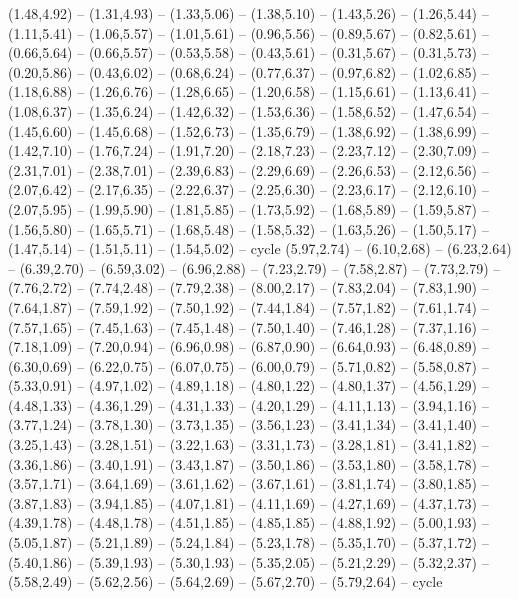 \expandafter\def\csname geo:gebiet:1945-Netherlands\endcsname{
  (1.48,4.92) -- (1.31,4.93) -- (1.33,5.06) -- (1.38,5.10) -- (1.43,5.26) -- (1.26,5.44) -- (1.11,5.41) -- (1.06,5.57) -- (1.01,5.61) -- (0.96,5.56) -- (0.89,5.67) -- (0.82,5.61) -- (0.66,5.64) -- (0.66,5.57) -- (0.53,5.58) -- (0.43,5.61) -- (0.31,5.67) -- (0.31,5.73) -- (0.20,5.86) -- (0.43,6.02) -- (0.68,6.24) -- (0.77,6.37) -- (0.97,6.82) -- (1.02,6.85) -- (1.18,6.88) -- (1.26,6.76) -- (1.28,6.65) -- (1.20,6.58) -- (1.15,6.61) -- (1.13,6.41) -- (1.08,6.37) -- (1.35,6.24) -- (1.42,6.32) -- (1.53,6.36) -- (1.58,6.52) -- (1.47,6.54) -- (1.45,6.60) -- (1.45,6.68) -- (1.52,6.73) -- (1.35,6.79) -- (1.38,6.92) -- (1.38,6.99) -- (1.42,7.10) -- (1.76,7.24) -- (1.91,7.20) -- (2.18,7.23) -- (2.23,7.12) -- (2.30,7.09) -- (2.31,7.01) -- (2.38,7.01) -- (2.39,6.83) -- (2.29,6.69) -- (2.26,6.53) -- (2.12,6.56) -- (2.07,6.42) -- (2.17,6.35) -- (2.22,6.37) -- (2.25,6.30) -- (2.23,6.17) -- (2.12,6.10) -- (2.07,5.95) -- (1.99,5.90) -- (1.81,5.85) -- (1.73,5.92) -- (1.68,5.89) -- (1.59,5.87) -- (1.56,5.80) -- (1.65,5.71) -- (1.68,5.48) -- (1.58,5.32) -- (1.63,5.26) -- (1.50,5.17) -- (1.47,5.14) -- (1.51,5.11) -- (1.54,5.02) -- cycle}
\expandafter\def\csname geo:gebiet:1945-Austria\endcsname{
  (5.97,2.74) -- (6.10,2.68) -- (6.23,2.64) -- (6.39,2.70) -- (6.59,3.02) -- (6.96,2.88) -- (7.23,2.79) -- (7.58,2.87) -- (7.73,2.79) -- (7.76,2.72) -- (7.74,2.48) -- (7.79,2.38) -- (8.00,2.17) -- (7.83,2.04) -- (7.83,1.90) -- (7.64,1.87) -- (7.59,1.92) -- (7.50,1.92) -- (7.44,1.84) -- (7.57,1.82) -- (7.61,1.74) -- (7.57,1.65) -- (7.45,1.63) -- (7.45,1.48) -- (7.50,1.40) -- (7.46,1.28) -- (7.37,1.16) -- (7.18,1.09) -- (7.20,0.94) -- (6.96,0.98) -- (6.87,0.90) -- (6.64,0.93) -- (6.48,0.89) -- (6.30,0.69) -- (6.22,0.75) -- (6.07,0.75) -- (6.00,0.79) -- (5.71,0.82) -- (5.58,0.87) -- (5.33,0.91) -- (4.97,1.02) -- (4.89,1.18) -- (4.80,1.22) -- (4.80,1.37) -- (4.56,1.29) -- (4.48,1.33) -- (4.36,1.29) -- (4.31,1.33) -- (4.20,1.29) -- (4.11,1.13) -- (3.94,1.16) -- (3.77,1.24) -- (3.78,1.30) -- (3.73,1.35) -- (3.56,1.23) -- (3.41,1.34) -- (3.41,1.40) -- (3.25,1.43) -- (3.28,1.51) -- (3.22,1.63) -- (3.31,1.73) -- (3.28,1.81) -- (3.41,1.82) -- (3.36,1.86) -- (3.40,1.91) -- (3.43,1.87) -- (3.50,1.86) -- (3.53,1.80) -- (3.58,1.78) -- (3.57,1.71) -- (3.64,1.69) -- (3.61,1.62) -- (3.67,1.61) -- (3.81,1.74) -- (3.80,1.85) -- (3.87,1.83) -- (3.94,1.85) -- (4.07,1.81) -- (4.11,1.69) -- (4.27,1.69) -- (4.37,1.73) -- (4.39,1.78) -- (4.48,1.78) -- (4.51,1.85) -- (4.85,1.85) -- (4.88,1.92) -- (5.00,1.93) -- (5.05,1.87) -- (5.21,1.89) -- (5.24,1.84) -- (5.23,1.78) -- (5.35,1.70) -- (5.37,1.72) -- (5.40,1.86) -- (5.39,1.93) -- (5.30,1.93) -- (5.35,2.05) -- (5.21,2.29) -- (5.32,2.37) -- (5.58,2.49) -- (5.62,2.56) -- (5.64,2.69) -- (5.67,2.70) -- (5.79,2.64) -- cycle}
